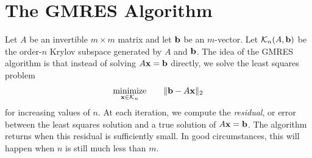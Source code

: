 \section*{The GMRES Algorithm}
Let $A$ be an invertible $m \times m$ matrix and let ${\bf b}$ be an $m$-vector.
Let $\mathcal{K}_n(A, {\bf b})$ be the order-$n$ Krylov subspace generated by $A$ and ${\bf b}$.
The idea of the GMRES algorithm is that instead of solving $A{\bf x} = {\bf b}$ directly, we solve the least squares problem
\begin{equation}
\underset{{\bf x} \in \mathcal{K}_n}{\text{minimize}}\qquad \|{\bf b}-A{\bf x}\|_2
\label{eq:GMRES_lstsq1}
\end{equation}
for increasing values of $n$.
At each iteration, we compute the \emph{residual}, or error between the least squares solution and a true solution of $A{\bf x} = {\bf b}$.
The algorithm returns when this residual is sufficiently small.
In good circumstances, this will happen when $n$ is still much less than $m$.

